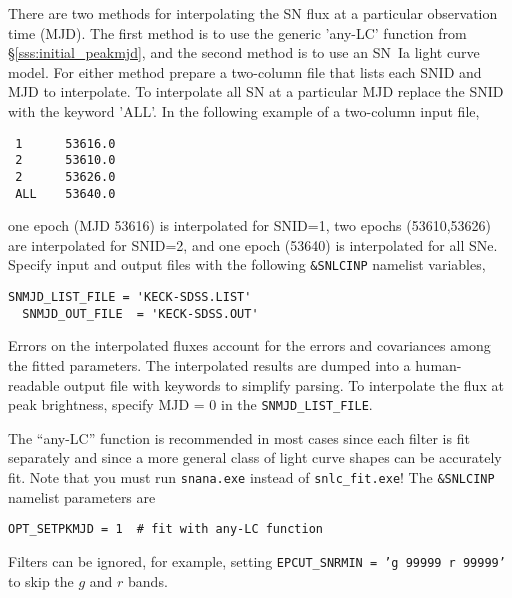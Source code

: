 \documentclass[12pt]{article}
\begin{document}
There are two methods for interpolating the SN flux 
at a particular observation time (MJD). The first method
is to use the generic 'any-LC' function from 
\S\ref{sss:initial_peakmjd},
and the second method is to use an SN~Ia light curve model.
For either method prepare a two-column file that lists each 
SNID and MJD to interpolate. To interpolate all SN at a
particular MJD replace the SNID with the keyword 'ALL'.
In the following example of a two-column input file,
\begin{verbatim}
 1      53616.0
 2      53610.0
 2      53626.0
 ALL    53640.0
\end{verbatim}
%
one epoch (MJD 53616) is interpolated for SNID=1, 
two epochs (53610,53626) are interpolated for SNID=2,
and one epoch (53640) is interpolated for all SNe.
Specify input and output files with the
following {\tt \&SNLCINP} namelist variables,
%
\begin{Verbatim}[frame=single]
  SNMJD_LIST_FILE = 'KECK-SDSS.LIST'
  SNMJD_OUT_FILE  = 'KECK-SDSS.OUT'
\end{Verbatim}
%
Errors on the interpolated fluxes account for the 
errors and covariances among the fitted parameters.
The interpolated results are dumped into a 
human-readable output file with keywords to simplify parsing.
To interpolate the flux at peak brightness,
specify MJD = 0 in the {\tt SNMJD\_LIST\_FILE}.


\bigskip
The ``any-LC'' function is recommended in most cases
since each filter is fit separately and since a more
general class of light curve shapes can be accurately fit.
Note that you must run {\tt snana.exe} instead of {\tt snlc\_fit.exe}! 
The {\tt \&SNLCINP} namelist parameters are
%
\begin{Verbatim}[frame=single]
     OPT_SETPKMJD = 1  # fit with any-LC function 
\end{Verbatim}
%
Filters can be ignored, for example, setting
{\tt EPCUT\_SNRMIN = 'g 99999  r 99999'}
to skip the $g$ and $r$ bands.
\end{document}

